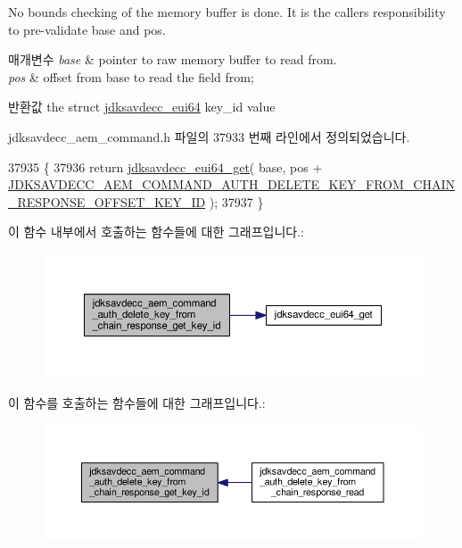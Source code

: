 No bounds checking of the memory buffer is done. It is the caller\textquotesingle{}s responsibility to pre-\/validate base and pos.


\begin{DoxyParams}{매개변수}
{\em base} & pointer to raw memory buffer to read from. \\
\hline
{\em pos} & offset from base to read the field from; \\
\hline
\end{DoxyParams}
\begin{DoxyReturn}{반환값}
the struct \hyperlink{structjdksavdecc__eui64}{jdksavdecc\+\_\+eui64} key\+\_\+id value 
\end{DoxyReturn}


jdksavdecc\+\_\+aem\+\_\+command.\+h 파일의 37933 번째 라인에서 정의되었습니다.


\begin{DoxyCode}
37935 \{
37936     \textcolor{keywordflow}{return} \hyperlink{group__eui64_ga2652311a25a6b91cddbed75c108c7031}{jdksavdecc\_eui64\_get}( base, pos + 
      \hyperlink{group__command__auth__delete__key__from__chain__response_ga2911d1ebcae1d04d524ecf8e568109a2}{JDKSAVDECC\_AEM\_COMMAND\_AUTH\_DELETE\_KEY\_FROM\_CHAIN\_RESPONSE\_OFFSET\_KEY\_ID}
       );
37937 \}
\end{DoxyCode}


이 함수 내부에서 호출하는 함수들에 대한 그래프입니다.\+:
\nopagebreak
\begin{figure}[H]
\begin{center}
\leavevmode
\includegraphics[width=350pt]{group__command__auth__delete__key__from__chain__response_ga096de062c9d18253301a80a27a3f78a2_cgraph}
\end{center}
\end{figure}




이 함수를 호출하는 함수들에 대한 그래프입니다.\+:
\nopagebreak
\begin{figure}[H]
\begin{center}
\leavevmode
\includegraphics[width=350pt]{group__command__auth__delete__key__from__chain__response_ga096de062c9d18253301a80a27a3f78a2_icgraph}
\end{center}
\end{figure}


